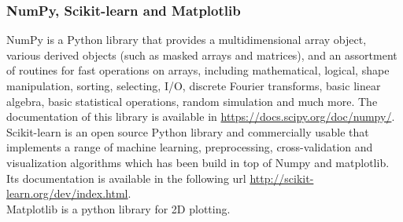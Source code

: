 \subsubsection{NumPy, Scikit-learn and Matplotlib}
NumPy is a Python library that provides a multidimensional array object, various derived objects (such as masked arrays and matrices), and an assortment of routines for fast operations on arrays, including mathematical, logical, shape manipulation, sorting, selecting, I/O, discrete Fourier transforms, basic linear algebra, basic statistical operations, random simulation and much more. The documentation of this library is available in \url{https://docs.scipy.org/doc/numpy/}.\\

Scikit-learn is an open source Python library and commercially usable that implements a range of machine learning, preprocessing, cross-validation and visualization algorithms which has been build in top of Numpy and matplotlib. Its documentation is available in the following url \url{http://scikit-learn.org/dev/index.html}.\\

Matplotlib is a python library for 2D plotting.
